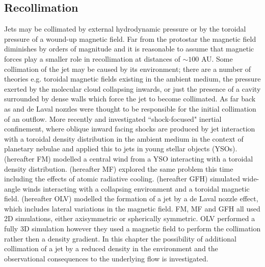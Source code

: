 \subsection{Recollimation}
Jets may be collimated by external hydrodynamic pressure or by the toroidal pressure of a wound-up magnetic field.
Far from the protostar the magnetic field diminishes by orders of magnitude and it is reasonable to assume that magnetic forces play a smaller role in recollimation at distances of $\sim 100$ AU. 
Some collimation of the jet may be caused by its environment; there are a
number of theories e.g. toroidal magnetic fields existing in the ambient medium, the pressure exerted by the molecular cloud collapsing
inwards, or just the presence of a cavity surrounded by dense walls
which force the jet to become collimated.  
As far back as \citet{1982ApJ...261..115K} and \citet{1989ApJ...344..404R} de Laval nozzles were thought to be responsible for the initial collimation of an
outflow.  
More recently \citet{1991A&A...252..718M,1992A&A...253..224I} and \citet{1992Natur.355..524I}
investigated ``shock-focused" inertial confinement, where oblique inward
facing shocks are produced by jet interaction with a toroidal density
distribution in the ambient medium \citep{1998ApJ...494L..79F} in the
context of planetary nebulae and \citet{1994A&A...290..643F} applied
this to jets in young stellar objects (YSOs).
\citet{1996ApJ...472..684F} (hereafter FM) modelled a central wind from
a YSO interacting with a toroidal density distribution.
\citet{1997MNRAS.292..795M} (hereafter MF) explored the same problem this time
including the effects of atomic radiative cooling.
\citet{2003ApJ...582..269G} (hereafter GFH) simulated wide-angle winds
interacting with a collapsing environment and a toroidal magnetic field.
\citet{2004ApJ...611..575O} (hereafter OLV) modelled the formation of a
jet by a de Laval nozzle effect, which includes lateral variations in
the magnetic field.  FM, MF and GFH all used 2D simulations, either
axisymmetric or spherically symmetric.  OLV performed a fully 3D
simulation however they used a magnetic field to perform the collimation
rather then a density gradient.  
In this chapter the possibility of additional collimation of a jet by a reduced density in the environment and the observational consequences to the underlying flow is investigated.



